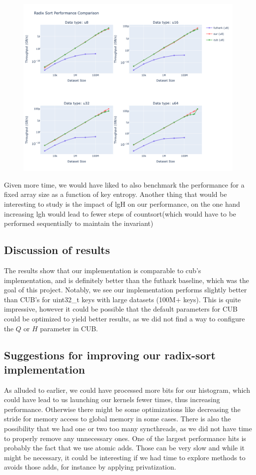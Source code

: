 \documentclass{article}
\begin{document}
\begin{figure}[h]
\includegraphics[width=1\textwidth]{images/combined_benchmarks.png}
\end{figure}

Given more time, we would have liked to also benchmark the performance for a fixed array size as a function of key entropy.
Another thing that would be interesting to study is the impact of lgH on our performance, on the one hand increasing lgh would lead to fewer steps of countsort(which would have to be performed sequentially to maintain the invariant)


\subsection{Discussion of results}
The results show that our implementation is comparable to cub's implementation, and is definitely better than the futhark baseline, which was the goal of this project. Notably, we see our implementation performs slightly better than CUB's for uint32\_t keys with large datasets (100M+ keys). This is quite impressive, however it could be possible that the default parameters for CUB could be optimized to yield better results, as we did not find a way to configure the $Q$ or $H$ parameter in CUB. 

\subsection{Suggestions for improving our radix-sort implementation}
As alluded to earlier, we could have processed more bits for our histogram, which could have lead to us launching our kernels fewer times, thus increasing performance. Otherwise there might be some optimizations like decreasing the stride for memory access to global memory in some cases. There is also the possibility that we had one or two too many syncthreads, as we did not have time to properly remove any unnecessary ones. One of the largest performance hits is probably the fact that we use atomic adds. Those can be very slow and while it might be necessary, it could be interesting if we had time to explore methods to avoids those adds, for instance by applying privatization.
\end{document}

